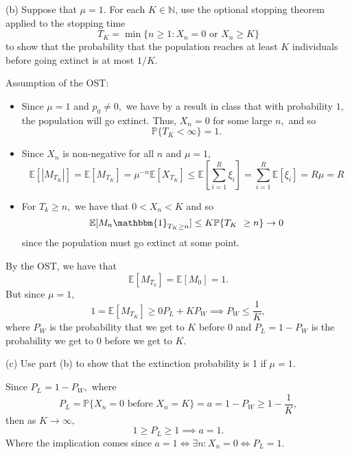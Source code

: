 \documentclass[11pt]{article}
\newcommand{\bbE}{\mathbb{E}}
\newcommand{\bbP}{\mathbb{P}}
\begin{document}
(b) Suppose that \(\mu = 1\). For each \(K \in \mathbb{N}\), use the optional stopping theorem applied to the stopping time
\[
T_K = \min\{n \geq 1 : X_n = 0 \text{ or } X_n \geq K\}
\]
to show that the probability that the population reaches at least \(K\) individuals before going extinct is at most \(1/K\).
\begin{solution}
    Assumption of the OST:
    \begin{itemize}
        \item Since $\mu = 1$ and $p_0 \neq 0,$ we have by a result in class that with probability $1,$ the population will go extinct. Thus, $X_n = 0$ for some large $n,$ and so  
        \[\bbP\{T_K < \infty\} = 1.\]
        \item Since $X_n$ is non-negative for all $n$ and $\mu = 1,$
        \[\bbE[|M_{T_K}|] = \bbE[M_{T_K}] =\mu^{-n} \bbE[X_{T_K}]  \leq \bbE\left[\sum_{i=1}^{R} \xi_i\right]=  \sum_{i=1}^R \bbE[\xi_i] = R\mu = R\]
        \item For $T_k \geq n,$ we have that $0<X_n < K$ and so
        \[\bbE[M_n \mathbbm{1}_{T_K \geq n}] \leq K \bbP\{T_K\ \geq n\} \to 0\] since the population must go extinct at some point.
    \end{itemize}
    By the OST, we have that 
    \[\bbE[M_{T_k}] = \bbE[M_0] = 1.\] But since $\mu = 1,$
    \[1 =\bbE[M_{T_K}] \geq 0P_L + KP_W \implies P_W \leq \frac{1}{K},\] where $P_W$ is the probability that we get to $K$ before $0$ and $P_L = 1-P_W$ is the probability we get to $0$ before we get to $K$.
\end{solution}

(c) Use part (b) to show that the extinction probability is 1 if \(\mu = 1\).
\begin{solution}
Since $P_L = 1-P_W,$ where 
\[P_L = \bbP\{X_n= 0 \text{ before }X_n = K\} = a = 1-P_W \geq 1-\frac{1}{K},\] then as $K\to \infty,$ 
\[1 \geq P_L \geq 1 \implies a = 1.\] Where the implication comes since $a = 1 \iff \exists n :X_n =0 \iff P_L = 1.$
\end{solution}

\newpage
\end{document}

